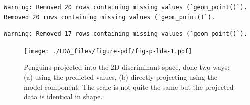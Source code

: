 \documentclass[
  letterpaper,
]{book}
\newenvironment{Shaded}{\begin{snugshade}}{\end{snugshade}}
\newcommand{\AttributeTok}[1]{\textcolor[rgb]{0.40,0.45,0.13}{#1}}
\newcommand{\ConstantTok}[1]{\textcolor[rgb]{0.56,0.35,0.01}{#1}}
\newcommand{\DecValTok}[1]{\textcolor[rgb]{0.68,0.00,0.00}{#1}}
\newcommand{\FloatTok}[1]{\textcolor[rgb]{0.68,0.00,0.00}{#1}}
\newcommand{\FunctionTok}[1]{\textcolor[rgb]{0.28,0.35,0.67}{#1}}
\newcommand{\NormalTok}[1]{\textcolor[rgb]{0.00,0.23,0.31}{#1}}
\newcommand{\OtherTok}[1]{\textcolor[rgb]{0.00,0.23,0.31}{#1}}
\newcommand{\SpecialCharTok}[1]{\textcolor[rgb]{0.37,0.37,0.37}{#1}}
\newcommand{\StringTok}[1]{\textcolor[rgb]{0.13,0.47,0.30}{#1}}
\begin{document}
\begin{Shaded}
\end{Shaded}

\begin{verbatim}
Warning: Removed 20 rows containing missing values (`geom_point()`).
Removed 20 rows containing missing values (`geom_point()`).
\end{verbatim}

\begin{verbatim}
Warning: Removed 17 rows containing missing values (`geom_point()`).
\end{verbatim}

\begin{figure}[H]

{\centering \texttt{[image: ./LDA\_files/figure-pdf/fig-p-lda-1.pdf]}

}

\caption{\label{fig-p-lda}Penguins projected into the 2D discriminant
space, done two ways: (a) using the predicted values, (b) directly
projecting using the model component. The scale is not quite the same
but the projected data is identical in shape.}

\end{figure}
\end{document}
